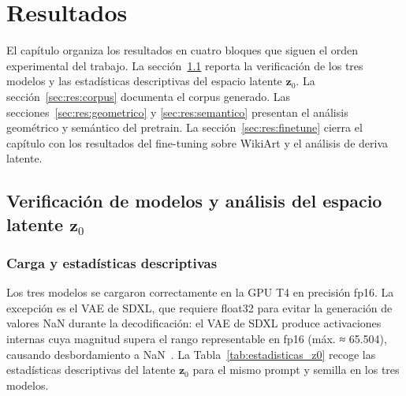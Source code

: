 \documentclass[12pt, a4paper, twoside]{book}
\newcommand{\z}{\mathbf{z}}
\begin{document}
\mainmatter

\chapter{Resultados}
\label{ch:resultados}

El capítulo organiza los resultados en cuatro bloques que siguen el orden experimental del trabajo.
La sección~\ref{sec:res:modelos} reporta la verificación de los tres modelos y las estadísticas
descriptivas del espacio latente $\z_0$. La sección~\ref{sec:res:corpus} documenta el corpus
generado. Las secciones~\ref{sec:res:geometrico} y \ref{sec:res:semantico} presentan el análisis
geométrico y semántico del pretrain. La sección~\ref{sec:res:finetune} cierra el capítulo con los
resultados del fine-tuning sobre WikiArt y el análisis de deriva latente.

\section{Verificación de modelos y análisis del espacio latente $\z_0$}
\label{sec:res:modelos}

\subsection{Carga y estadísticas descriptivas}

Los tres modelos se cargaron correctamente en la GPU T4 en precisión fp16.
La excepción es el VAE de SDXL, que requiere float32 para evitar la generación de valores 
NaN durante la decodificación: el VAE de SDXL produce activaciones internas cuya magnitud 
supera el rango representable en fp16 (máx. ≈ 65.504), causando desbordamiento a NaN~\citep
{podell2023sdxl}. La Tabla~\ref{tab:estadisticas_z0} recoge las estadísticas descriptivas 
del latente $\z_0$ para el mismo prompt y semilla en los tres modelos.
\end{document}
